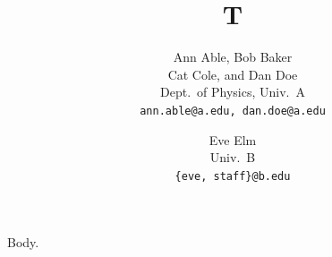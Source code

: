 \documentclass{article}
\title{T}
\author{Ann Able, Bob Baker\\
  Cat Cole, and Dan Doe\\
  Dept.\ of Physics, Univ.\ A\\
  \texttt{ann.able@a.edu, dan.doe@a.edu}
  \and Eve Elm\\ Univ.\ B\\ \texttt{\{eve, staff\}@b.edu}}
\begin{document}
\maketitle
Body.
\end{document}

